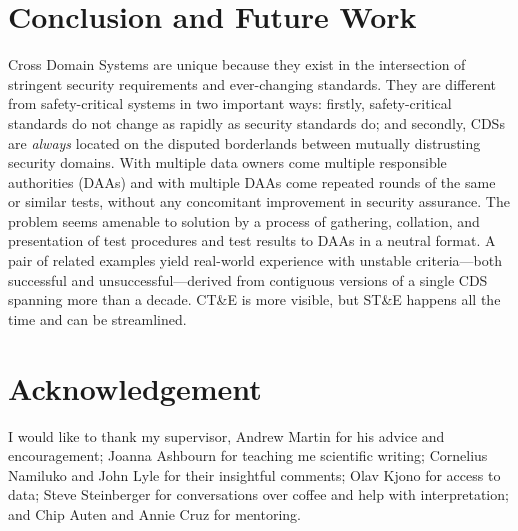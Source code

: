 \documentclass[10pt,letterpaper,conference,compsocconf]{IEEEtran}
\begin{document}

\section{Conclusion and Future Work}

Cross Domain Systems are unique because they exist in the
intersection
of stringent security requirements and ever-changing standards.  They
are different from safety-critical systems in two important ways:
firstly, safety-critical standards do not change as rapidly as security
standards do; and secondly, CDSs are {\it always} located on the
disputed borderlands between mutually distrusting security domains.
With multiple data owners come multiple responsible authorities (DAAs)
and with multiple DAAs come repeated rounds of the same or similar
tests, without any concomitant improvement in security assurance.  The
problem seems amenable to solution by a process of
gathering, collation, and presentation of test procedures and test
results to DAAs in a neutral format.  A pair of related examples yield
real-world experience with unstable criteria---both successful and
unsuccessful---derived from contiguous versions of a single CDS spanning
more than a decade.  CT\&E is more visible, but ST\&E happens all the
time and can be streamlined.



\section*{Acknowledgement}

I would like to thank my supervisor, Andrew Martin
for his advice and encouragement; Joanna Ashbourn for teaching me
scientific writing; Cornelius Namiluko and John Lyle for their
insightful comments; Olav Kjono for access to data;
Steve Steinberger for conversations over coffee and help with interpretation;
and Chip Auten and Annie Cruz for mentoring.




\end{document}
